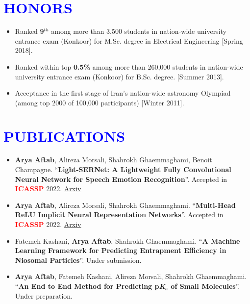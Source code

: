 \documentclass[letterpaper,11pt]{article}
\newcommand{\resumeSubHeadingListStart}{\begin{itemize}[leftmargin=0.0in, label={}]}
\begin{document}
	\section{\Large{\textcolor{blue}{HONORS}}}
	\begin{itemize}[itemsep=-2pt, parsep=5pt]
		\item Ranked \textbf{9$^{th}$} among more than 3,500 students in nation-wide university entrance exam (Konkoor) for M.Sc. degree in Electrical Engineering [Spring 2018].
		\item Ranked within top \textbf{0.5\%} among more than 260,000 students in nation-wide university entrance exam (Konkoor) for B.Sc. degree. [Summer 2013].
		\item Acceptance in the first stage of Iran’s nation-wide astronomy Olympiad (among top 2000 of 100,000 participants) [Winter 2011].
		
	\end{itemize}
	
	
	\section{\Large{\textcolor{blue}{PUBLICATIONS}}}
	\begin{itemize}[itemsep=0pt, parsep=5pt]
		\item \textbf{Arya Aftab}, Alireza Morsali, Shahrokh Ghaemmaghami, Benoit Champagne. “\textbf{Light-SERNet: A Lightweight Fully Convolutional Neural Network for Speech Emotion Recognition}”. Accepted in \textbf{\textcolor{red}{ICASSP}} 2022. \href{https://arxiv.org/pdf/2110.03435.pdf}{Arxiv {\raisebox{-0.1\height}\faExternalLink }}
		\item \textbf{Arya Aftab}, Alireza Morsali, Shahrokh Ghaemmaghami. “\textbf{Multi-Head ReLU Implicit Neural Representation Networks}”. Accepted in \textbf{\textcolor{red}{ICASSP}} 2022. \href{https://arxiv.org/pdf/2110.03448.pdf}{Arxiv {\raisebox{-0.1\height}\faExternalLink }}
		\item Fatemeh Kashani, \textbf{Arya Aftab}, Shahrokh Ghaemmaghami. “\textbf{A Machine Learning Framework for Predicting Entrapment Efficiency in Niosomal Particles}”. Under submission.
		\item \textbf{Arya Aftab}, Fatemeh Kashani, Alireza Morsali, Shahrokh Ghaemmaghami. “\textbf{An End to End Method for Predicting p\textit{K}$_{a}$ of Small Molecules}”. Under preparation.
	\end{itemize}
	\vspace{-10pt}
	
\end{document}
